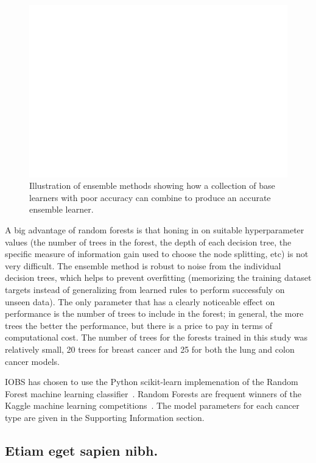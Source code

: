 \documentclass[10pt,letterpaper]{article}
\begin{document}
\begin{figure}[!ht]
  \centering
    \includegraphics[scale=.75]{ensemble}
\caption{\label{fig:ensemble} Illustration of ensemble methods showing how a collection of base learners with poor accuracy can combine to produce an accurate ensemble learner.}
\end{figure}


A big advantage of random forests is that honing in on suitable hyperparameter values (the number of trees in the forest, the depth of each decision tree, the specific measure of information gain used to choose the node splitting, etc) is not very difficult. The ensemble method is robust to noise from the individual decision trees, which helps to prevent overfitting (memorizing the training dataset targets instead of generalizing from learned rules to perform successfuly on unseen data). The only parameter that has a clearly noticeable effect on performance is the number of trees to include in the forest; in general, the more trees the better the performance, but there is a price to pay in terms of computational cost. The number of trees for the forests trained in this study was relatively small, 20 trees for breast cancer and 25 for both the lung and colon cancer models. 

IOBS has chosen to use the Python scikit-learn implemenation of the Random Forest machine 
learning classifier~\cite{rf}.
Random Forests are frequent winners of the Kaggle machine learning competitions~\cite{kagglerf}.
The model parameters for each cancer type are given in the Supporting Information section.

\subsection*{Etiam eget sapien nibh.}
\end{document}

